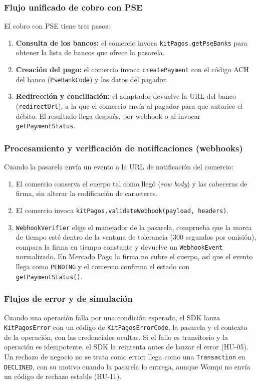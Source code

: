 \subsubsection{Flujo unificado de cobro con PSE}
El cobro con PSE tiene tres pasos:
\begin{enumerate}
    \item \textbf{Consulta de los bancos:} el comercio invoca \texttt{kitPagos.getPseBanks} para obtener la lista de bancos que ofrece la pasarela.
    \item \textbf{Creación del pago:} el comercio invoca \texttt{createPayment} con el código ACH del banco (\texttt{PseBankCode}) y los datos del pagador.
    \item \textbf{Redirección y conciliación:} el adaptador devuelve la URL del banco (\texttt{redirectUrl}), a la que el comercio envía al pagador para que autorice el débito. El resultado llega después, por webhook o al invocar \texttt{getPaymentStatus}.
\end{enumerate}

\subsubsection{Procesamiento y verificación de notificaciones (webhooks)}
Cuando la pasarela envía un evento a la URL de notificación del comercio:
\begin{enumerate}
    \item El comercio conserva el cuerpo tal como llegó (\textit{raw body}) y las cabeceras de firma, sin alterar la codificación de caracteres.
    \item El comercio invoca \texttt{kitPagos.validateWebhook(payload, headers)}.
    \item \texttt{WebhookVerifier} elige el manejador de la pasarela, comprueba que la marca de tiempo esté dentro de la ventana de tolerancia (300 segundos por omisión), compara la firma en tiempo constante y devuelve un \texttt{WebhookEvent} normalizado. En Mercado Pago la firma no cubre el cuerpo, así que el evento llega como \texttt{PENDING} y el comercio confirma el estado con \texttt{getPaymentStatus()}.
\end{enumerate}

\subsubsection{Flujos de error y de simulación}
Cuando una operación falla por una condición esperada, el SDK lanza \texttt{KitPagosError} con un código de \texttt{KitPagosErrorCode}, la pasarela y el contexto de la operación, con las credenciales ocultas. Si el fallo es transitorio y la operación es idempotente, el SDK la reintenta antes de lanzar el error (HU-05). Un rechazo de negocio no se trata como error: llega como una \texttt{Transaction} en \texttt{DECLINED}, con su motivo cuando la pasarela lo entrega, aunque Wompi no envía un código de rechazo estable (HU-11).

